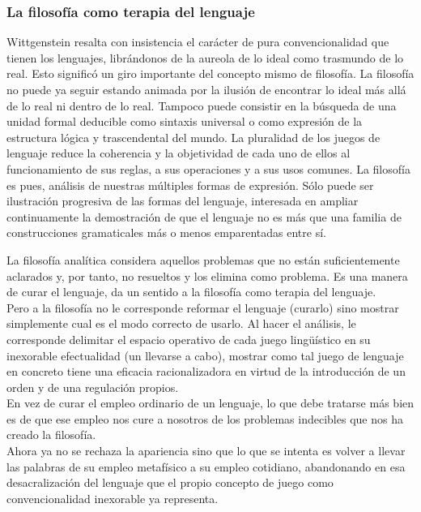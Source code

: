 \documentclass[a4paper, 11pt, twocolumn, spanish]{article}
\begin{document}
\subsubsection{La filosofía como terapia del lenguaje}
\label{sec:org4ceea86}
Wittgenstein resalta con insistencia el carácter de pura
convencionalidad que tienen los lenguajes, librándonos de la aureola
de lo ideal como trasmundo de lo real. Esto significó un giro
importante del concepto mismo de filosofía. La filosofía no puede ya
seguir estando animada por la ilusión de encontrar lo ideal más allá
de lo real ni dentro de lo real. Tampoco puede consistir en la
búsqueda de una unidad formal deducible como sintaxis universal o como
expresión de la estructura lógica y trascendental del mundo. La
pluralidad de los juegos de lenguaje reduce la coherencia y la
objetividad de cada uno de ellos al funcionamiento de sus reglas, a
sus operaciones y a sus usos comunes. La filosofía es pues, análisis
de nuestras múltiples formas de expresión. Sólo puede ser ilustración
progresiva de las formas del lenguaje, interesada en ampliar
continuamente la demostración de que el lenguaje no es más que una
familia de construcciones gramaticales más o menos emparentadas entre
sí.

La filosofía analítica considera aquellos problemas que no están
suficientemente aclarados y, por tanto, no resueltos y los elimina
como problema. Es una manera de curar el lenguaje, da un sentido a la
filosofía como terapia del lenguaje.\\
Pero a la filosofía no le corresponde reformar el lenguaje (curarlo)
sino mostrar simplemente cual es el modo correcto de usarlo. Al hacer
el análisis, le corresponde delimitar el espacio operativo de cada
juego lingüístico en su inexorable efectualidad (un llevarse a cabo),
mostrar como tal juego de lenguaje en concreto tiene una eficacia
racionalizadora en virtud de la introducción de un orden y de una
regulación propios.\\
En vez de curar el empleo ordinario de un lenguaje, lo que debe
tratarse más bien es de que ese empleo nos cure a nosotros de los
problemas indecibles que nos ha creado la filosofía.\\
Ahora ya no se rechaza la apariencia sino que lo que se intenta es
volver a llevar las palabras de su empleo metafísico a su empleo
cotidiano, abandonando en esa desacralización del lenguaje que el
propio concepto de juego como convencionalidad inexorable ya
representa.
\end{document}
